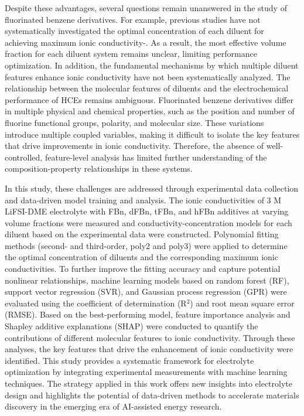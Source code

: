 \documentclass[11pt, a4paper]{article}
\begin{document}
{Despite these advantages, several questions remain unanswered in the study of fluorinated benzene derivatives. For example, previous studies have not systematically investigated the optimal concentration of each diluent for achieving maximum ionic conductivity\cite{ref.8}-\cite{ref.11}. As a result, the most effective volume fraction for each diluent system remains unclear, limiting performance optimization. In addition, the fundamental mechanisms by which multiple diluent features enhance ionic conductivity have not been systematically analyzed. The relationship between the molecular features of diluents and the electrochemical performance of HCEs remains ambiguous. Fluorinated benzene derivatives differ in multiple physical and chemical properties, such as the position and number of fluorine functional groups, polarity, and molecular size. These variations introduce multiple coupled variables, making it difficult to isolate the key features that drive improvements in ionic conductivity. Therefore, the absence of well-controlled, feature-level analysis has limited further understanding of the composition-property relationships in these systems.

In this study, these challenges are addressed through experimental data collection and data-driven model training and analysis. The ionic conductivities of 3 M LiFSI-DME electrolyte with FBn, dFBn, tFBn, and hFBn additives at varying volume fractions were measured and conductivity-concentration models for each diluent based on the experimental data were constructed. Polynomial fitting methods (second- and third-order, poly2 and poly3) were applied to determine the optimal concentration of diluents and the corresponding maximum ionic conductivities. To further improve the fitting accuracy and capture potential nonlinear relationships, machine learning models based on random forest (RF)\cite{ref.12}, support vector regression (SVR)\cite{ref.13}, and Gaussian process regression (GPR)\cite{ref.14} were evaluated using the coefficient of determination (R$^2$) and root mean square error (RMSE). Based on the best-performing model, feature importance analysis and Shapley additive explanations (SHAP) were conducted to quantify the contributions of different molecular features to ionic conductivity\cite{ref.15}. Through these analyses, the key features that drive the enhancement of ionic conductivity were identified. This study provides a systematic framework for electrolyte optimization by integrating experimental measurements with machine learning techniques. The strategy applied in this work offers new insights into electrolyte design and highlights the potential of data-driven methods to accelerate materials discovery in the emerging era of AI-assisted energy research.}
\end{document}
